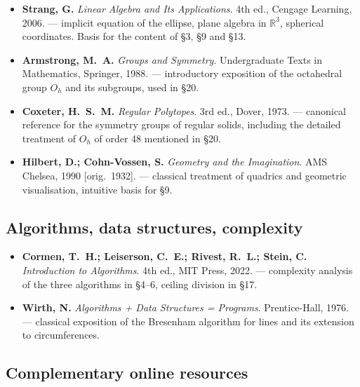 \documentclass[12pt,a4paper]{scrartcl}
\begin{document}
\begin{itemize}[leftmargin=1.4em,itemsep=0.3em,topsep=0.3em]
  \item \textbf{Strang, G.} \emph{Linear Algebra and Its Applications}. 4th ed.,
        Cengage Learning, 2006.
        --- implicit equation of the ellipse, plane algebra in $\mathbb{R}^3$,
        spherical coordinates. Basis for the content of §3, §9 and §13.

  \item \textbf{Armstrong, M.~A.} \emph{Groups and Symmetry}. Undergraduate Texts in
        Mathematics, Springer, 1988.
        --- introductory exposition of the octahedral group $O_h$ and its subgroups, used in §20.

  \item \textbf{Coxeter, H.~S.~M.} \emph{Regular Polytopes}. 3rd ed., Dover, 1973.
        --- canonical reference for the symmetry groups of regular solids, including the detailed treatment of $O_h$ of order 48 mentioned in §20.

  \item \textbf{Hilbert, D.; Cohn-Vossen, S.} \emph{Geometry and the Imagination}.
        AMS Chelsea, 1990 [orig.~1932].
        --- classical treatment of quadrics and geometric visualisation, intuitive basis for §9.
\end{itemize}

\subsection*{Algorithms, data structures, complexity}

\begin{itemize}[leftmargin=1.4em,itemsep=0.3em,topsep=0.3em]
  \item \textbf{Cormen, T.~H.; Leiserson, C.~E.; Rivest, R.~L.; Stein, C.}
        \emph{Introduction to Algorithms}. 4th ed., MIT Press, 2022.
        --- complexity analysis of the three algorithms in §4--6, ceiling division in §17.

  \item \textbf{Wirth, N.} \emph{Algorithms + Data Structures = Programs}.
        Prentice-Hall, 1976.
        --- classical exposition of the Bresenham algorithm for lines and its extension to circumferences.
\end{itemize}

\subsection*{Complementary online resources}
\end{document}
